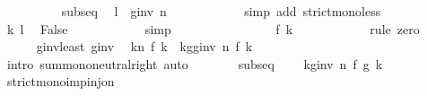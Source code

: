 \begin{isabellebody}
\ \ \ \ \ \ \ \ \isamarkupfalse%
\ subseq\ \isamarkupfalse%
\ {\isachardoublequoteopen}l\ {\isacharless}{\kern0pt}\ g{\isacharunderscore}{\kern0pt}inv\ n{\isachardoublequoteclose}\isanewline
\ \ \ \ \ \ \ \ \ \ \isamarkupfalse%
\ {\isacharparenleft}{\kern0pt}simp\ add{\isacharcolon}{\kern0pt}\ strict{\isacharunderscore}{\kern0pt}mono{\isacharunderscore}{\kern0pt}less{\isacharparenright}{\kern0pt}\isanewline
\ \ \ \ \ \ \ \ \isamarkupfalse%
\ k\ l\ \isamarkupfalse%
\ False\isanewline
\ \ \ \ \ \ \ \ \ \ \isamarkupfalse%
\ simp\isanewline
\ \ \ \ \ \ \isamarkupfalse%
\isanewline
\ \ \ \ \ \ \isamarkupfalse%
\ \isamarkupfalse%
\ {\isachardoublequoteopen}f\ k\ {\isacharequal}{\kern0pt}\ {}{\isachardoublequoteclose}\isanewline
\ \ \ \ \ \ \ \ \isamarkupfalse%
\ {\isacharparenleft}{\kern0pt}rule\ zero{\isacharparenright}{\kern0pt}\isanewline
\ \ \ \ \isacommand{{\isacharbraceright}{\kern0pt}}\isamarkupfalse%
\isanewline
\ \ \ \ \isamarkupfalse%
\ g{\isacharunderscore}{\kern0pt}inv{\isacharunderscore}{\kern0pt}least{\isacharprime}{\kern0pt}\ g{\isacharunderscore}{\kern0pt}inv\ \isamarkupfalse%
\ {\isachardoublequoteopen}{\isacharparenleft}{\kern0pt}{\isasymSum}k{\isacharless}{\kern0pt}n{\isachardot}{\kern0pt}\ f\ k{\isacharparenright}{\kern0pt}\ {\isacharequal}{\kern0pt}\ {\isacharparenleft}{\kern0pt}{\isasymSum}k{\isasymin}g{\isacharbackquote}{\kern0pt}{\isacharbraceleft}{\kern0pt}{\isachardot}{\kern0pt}{\isachardot}{\kern0pt}{\isacharless}{\kern0pt}g{\isacharunderscore}{\kern0pt}inv\ n{\isacharbraceright}{\kern0pt}{\isachardot}{\kern0pt}\ f\ k{\isacharparenright}{\kern0pt}{\isachardoublequoteclose}\isanewline
\ \ \ \ \ \ \isamarkupfalse%
\ {\isacharparenleft}{\kern0pt}intro\ sum{\isachardot}{\kern0pt}mono{\isacharunderscore}{\kern0pt}neutral{\isacharunderscore}{\kern0pt}right{\isacharparenright}{\kern0pt}\ auto\isanewline
\ \ \ \ \isamarkupfalse%
\ \isamarkupfalse%
\ subseq\ \isamarkupfalse%
\ {\isachardoublequoteopen}{\isasymdots}\ {\isacharequal}{\kern0pt}\ {\isacharparenleft}{\kern0pt}{\isasymSum}k{\isacharless}{\kern0pt}g{\isacharunderscore}{\kern0pt}inv\ n{\isachardot}{\kern0pt}\ f\ {\isacharparenleft}{\kern0pt}g\ k{\isacharparenright}{\kern0pt}{\isacharparenright}{\kern0pt}{\isachardoublequoteclose}\isanewline
\ \ \ \ \ \ \isamarkupfalse%
\ strict{\isacharunderscore}{\kern0pt}mono{\isacharunderscore}{\kern0pt}imp{\isacharunderscore}{\kern0pt}inj{\isacharunderscore}{\kern0pt}on\ \isamarkupfalse%

\end{isabellebody}
